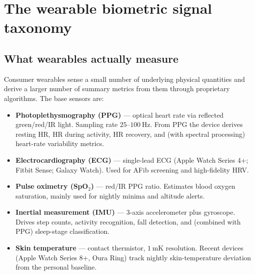 \documentclass[11pt,a4paper]{article}
\let\origsection\section
\renewcommand{\section}{\clearpage\origsection}
\theoremstyle{ia}
\newcommand{\1}{\mathbf{1}}
\begin{document}
\section{The wearable biometric signal taxonomy}\label{sec:taxonomy}

\subsection{What wearables actually measure}\label{ss:measure}

Consumer wearables sense a small number of underlying physical
quantities and derive a larger number of summary metrics from them
through proprietary algorithms. The base sensors are:

\begin{itemize}[leftmargin=*,nosep,topsep=4pt]
   \item \textbf{Photoplethysmography (PPG)} ---
         optical heart rate via reflected green/red/IR light. Sampling
         rate $25$--$\SI{100}{\hertz}$. From PPG the device derives
         resting HR, HR during activity, HR recovery, and (with
         spectral processing) heart-rate variability metrics.
   \item \textbf{Electrocardiography (ECG)} ---
         single-lead ECG (Apple Watch Series 4+; Fitbit Sense; Galaxy
         Watch). Used for AFib screening and high-fidelity HRV.
   \item \textbf{Pulse oximetry (SpO$_2$)} ---
         red/IR PPG ratio. Estimates blood oxygen saturation, mainly
         used for nightly minima and altitude alerts.
   \item \textbf{Inertial measurement (IMU)} ---
         3-axis accelerometer plus gyroscope. Drives step counts,
         activity recognition, fall detection, and (combined with PPG)
         sleep-stage classification.
   \item \textbf{Skin temperature} ---
         contact thermistor, $\SI{1}{\milli\kelvin}$ resolution.
         Recent devices (Apple Watch Series 8+, Oura Ring) track
         nightly skin-temperature deviation from the personal
         baseline.
\end{itemize}
\end{document}
